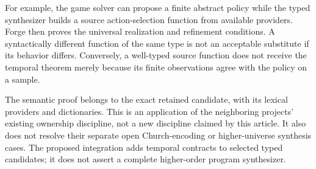 For example, the game solver can propose a finite abstract policy while the
typed synthesizer builds a source action-selection function from available
providers. Forge then proves the universal realization and refinement
conditions. A syntactically different function of the same type is not an
acceptable substitute if its behavior differs. Conversely, a well-typed source
function does not receive the temporal theorem merely because its finite
observations agree with the policy on a sample.

The semantic proof belongs to the exact retained candidate, with its lexical
providers and dictionaries. This is an application of the neighboring
projects' existing ownership discipline, not a new discipline claimed by this
article. It also does not resolve their separate open Church-encoding or
higher-universe synthesis cases. The proposed integration adds temporal
contracts to selected typed candidates; it does not assert a complete
higher-order program synthesizer.
